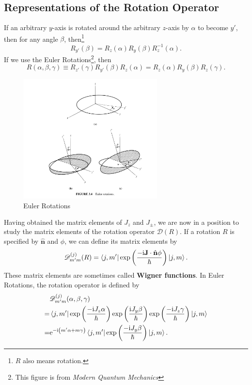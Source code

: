 \documentclass{article}
\theoremstyle{1}
\newcommand{\ii}{\mathrm{i}}
\newcommand{\ee}{\mathrm{e}}
\begin{document}
\subsection{Representations of the Rotation Operator}
If an arbitrary $y$-axis is rotated around the arbitrary $z$-axis by $\alpha$ to become $y'$, then for any angle $\beta$, then\footnote{$R$ also means rotation.}
\begin{equation}
    R_{y'}(\beta)=R_z(\alpha)R_y(\beta)R^{-1}_z(\alpha).
\end{equation}
If we use the Euler Rotations\footnote{This figure is from \textit{Modern Quantum Mechanics}}, then
\begin{equation}
    R(\alpha,\beta,\gamma)\equiv R_{z'}(\gamma)R_{y'}(\beta)R_z(\alpha)=R_z(\alpha)R_{y}(\beta)R_{z}(\gamma).
\end{equation}
\begin{figure}[H]
    \centering
    \includegraphics[width=0.65\textwidth]{figures/Euler Rotation.png}
    \caption{Euler Rotations}
\end{figure}
Having obtained the matrix elements of $J_z$ and $J_\pm$, we are now in a position to
study the matrix elements of the rotation operator $\mathscr{D}(R)$. If a rotation $R$ is specified
by $\hat{\mathbf{n}}$ and $\phi$, we can define its matrix elements by
\begin{equation}
    \mathscr{D}^{(j)}_{m'm}(R)=\bra{j,m'}\exp\left(\frac{-\ii \mathbf{J}\cdot\hat{\mathbf{n}}\phi}{\hbar}\right)\ket{j,m}.
\end{equation}
These matrix elements are sometimes called \textbf{Wigner functions}.
In Euler Rotations, the rotation operator is defined by
\begin{equation}
    \begin{aligned}
        &\mathscr{D}^{(j)}_{m'm}(\alpha,\beta,\gamma)\\
        =&\bra{j,m'}\exp\left(\frac{-\ii J_z \alpha}{\hbar }\right)\exp\left(\frac{\ii J_y \beta}{\hbar}\right)\exp\left(\frac{-\ii J_z \gamma}{\hbar}\right)\ket{j,m}\\
        =&\ee ^{-\ii\left( m' \alpha+m\gamma\right)}\bra{j,m'}\exp\left(\frac{-\ii J_y \beta}{\hbar}\right)\ket{j,m}.
    \end{aligned}
\end{equation}
\end{document}
